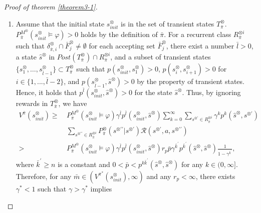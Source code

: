 \documentclass[a4j,12pt,oneside,openany,english,dvipdfmx]{jsbook}
\begin{document}
\begin{proof}[Proof of theorem \ref{theorem3-1}]
\begin{enumerate}
    \item Assume that the initial state $s^{\otimes}_{init}$ is in the set of transient states $T_{\bar{\pi}}^{\otimes}$.
    $P^{M^{\otimes}}_{\bar{\pi}}(s^{\otimes}_{init} \models \varphi) > 0$ holds by the definition of $\bar{\pi}$. For a recurrent class $R^{\otimes i}_{\bar{\pi}}$ such that $\delta^{\otimes}_{\bar{\pi}, i} \cap \bar{F}^{\otimes}_j \neq \emptyset$ for each accepting set
    $\bar{F}^{\otimes}_j$, there exist a number $\bar{l} > 0$, a state $\hat{s}^{\otimes}$ in $Post(T^{\otimes}_{\bar{\pi}}) \cap R^{\otimes i}_{\bar{\pi}}$, and a subset of transient states $\{ s^{\otimes}_1, \ldots , s^{\otimes}_{\bar{l}-1} \} \subset T^\otimes_{\bar{\pi}}$ such that $p(s^{\otimes}_{init}, s^{\otimes}_1)>0$, $p(s^{\otimes}_{i}, s^{\otimes}_{i+1})>0$ for $i \in \{ 1,...,\bar{l}-2 \}$, and $p(s^{\otimes}_{\bar{l}-1}, \hat{s}^{\otimes})>0$ by the property of transient states.
    Hence, it holds that $p^{\bar{l}}(s^{\otimes}_{init}, \hat{s}^{\otimes}) > 0$ for the state $\hat{s}^{\otimes}$. Thus, by ignoring rewards in $T^{\otimes}_{\bar{\pi}}$, we have
     \begin{align}
        V^{\bar{\pi}}(s^{\otimes}_{init})
        \geq\ & P^{M^{\otimes}}_{\bar{\pi}}(s^{\otimes}_{init} \models \varphi)  \gamma^{\bar{l}} p^{\bar{l}}(s^{\otimes}_{init}, \hat{s}^{\otimes})  \sum_{k=0}^{\infty} \sum_{s^{\otimes \prime} \in R^{\otimes i}_{\bar{\pi}}} \gamma^k p^k(\hat{s}^{\otimes}, s^{\otimes \prime}) \nonumber \\
         & \sum_{s^{\otimes \prime \prime} \in R^{\otimes i}_{\bar{\pi}}} P^{\otimes}_{\bar{\pi}}(s^{\otimes \prime \prime} | s^{\otimes \prime}) \mathcal{R}(s^{\otimes \prime}, a, s^{\otimes \prime \prime}) \nonumber \\
        >\ & P^{M^{\otimes}}_{\bar{\pi}}(s^{\otimes}_{init} \models \varphi)  \gamma^{\bar{l}} p^{\bar{l}}(s^{\otimes}_{init}, \hat{s}^{\otimes}) r_p \bar{p} \gamma^{\bar{k}^{\prime}}  p^{\bar{k}^{\prime}}(\hat{s}^{\otimes},\hat{s}^{\otimes}) \frac{1}{ 1 - \gamma^{\bar{k}^{\prime}} }, \nonumber
     \end{align}
     where $\bar{k}^{\prime}  \geq n$ is a constant and $0<\bar{p}< p^{k \bar{k}^{\prime}}(\hat{s}^{\otimes}, \hat{s}^{\otimes})$ for any $k \in (0, \infty]$.
     Therefore, for any $\bar{m} \in (V^{\pi^{\ast}}(s^{\otimes}_{init}), \infty)$ and any $r_p < \infty$, there exists $\gamma^{\ast}<1$ such that $\gamma > \gamma^{\ast}$ implies

\end{enumerate}
\end{proof}
\end{document}

